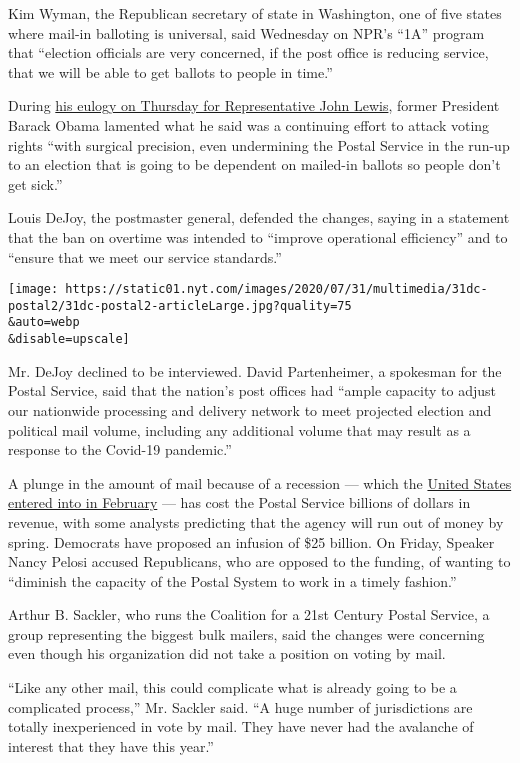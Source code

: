 Kim Wyman, the Republican secretary of state in Washington, one of five
states where mail-in balloting is universal, said Wednesday on NPR's
``1A'' program that ``election officials are very concerned, if the post
office is reducing service, that we will be able to get ballots to
people in time.''

During
\href{https://www.nytimes.com/2020/07/30/us/obama-eulogy-john-lewis-full-transcript.html}{his
eulogy on Thursday for Representative John Lewis}, former President
Barack Obama lamented what he said was a continuing effort to attack
voting rights ``with surgical precision, even undermining the Postal
Service in the run-up to an election that is going to be dependent on
mailed-in ballots so people don't get sick.''

Louis DeJoy, the postmaster general, defended the changes, saying in a
statement that the ban on overtime was intended to ``improve operational
efficiency'' and to ``ensure that we meet our service standards.''

\texttt{[image: https://static01.nyt.com/images/2020/07/31/multimedia/31dc-postal2/31dc-postal2-articleLarge.jpg?quality=75\\\&auto=webp\\\&disable=upscale]}

Mr. DeJoy declined to be interviewed. David Partenheimer, a spokesman
for the Postal Service, said that the nation's post offices had ``ample
capacity to adjust our nationwide processing and delivery network to
meet projected election and political mail volume, including any
additional volume that may result as a response to the Covid-19
pandemic.''

A plunge in the amount of mail because of a recession --- which the
\href{https://www.nytimes.com/2020/06/08/business/economy/us-economy-recession-2020.html}{United
States entered into in February} --- has cost the Postal Service
billions of dollars in revenue, with some analysts predicting that the
agency will run out of money by spring. Democrats have proposed an
infusion of \$25 billion. On Friday, Speaker Nancy Pelosi accused
Republicans, who are opposed to the funding, of wanting to ``diminish
the capacity of the Postal System to work in a timely fashion.''

Arthur B. Sackler, who runs the Coalition for a 21st Century Postal
Service, a group representing the biggest bulk mailers, said the changes
were concerning even though his organization did not take a position on
voting by mail.

``Like any other mail, this could complicate what is already going to be
a complicated process,'' Mr. Sackler said. ``A huge number of
jurisdictions are totally inexperienced in vote by mail. They have never
had the avalanche of interest that they have this year.''

